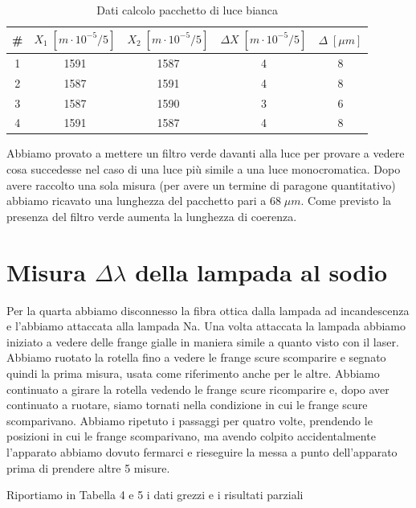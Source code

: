 \documentclass{article}
\begin{document}
\begin{table}[h!]
\centering
\begin{tabular}{ | c | c | c | c | c | }
\hline
\# & $X_1 \; [m \cdot 10^{-5}/5]$ & $X_2 \; [m \cdot 10^{-5}/5]$ & $\Delta X \; [m \cdot 10^{-5}/5]$ & $\Delta \; [\mu m]$\\
\hline
   1 & 1591 & 1587 & 4 & 8\\
   2 & 1587 & 1591 & 4 & 8\\
   3 & 1587 & 1590 & 3 & 6\\
   4 & 1591 & 1587 & 4 & 8\\
\hline
\end{tabular}
\caption{Dati calcolo pacchetto di luce bianca}
\label{table:3}
\end{table}


Abbiamo provato a mettere un filtro verde davanti alla luce per provare a vedere cosa succedesse nel caso di una luce più simile a una luce monocromatica. Dopo avere raccolto una sola misura (per avere un termine di paragone quantitativo) abbiamo ricavato una lunghezza del pacchetto pari a $68 \; \mu m$. Come previsto la presenza del filtro verde aumenta la lunghezza di coerenza.



\section{Misura $\Delta\lambda$ della lampada al sodio}
Per la quarta abbiamo disconnesso la fibra ottica dalla lampada ad incandescenza e l'abbiamo attaccata alla lampada Na. Una volta attaccata la lampada abbiamo iniziato a vedere delle frange gialle in maniera simile a quanto visto con il laser. Abbiamo ruotato la rotella fino a vedere le frange scure scomparire e segnato quindi la prima misura, usata come riferimento anche per le altre. Abbiamo continuato a girare la rotella vedendo le frange scure ricomparire e, dopo aver continuato a ruotare, siamo tornati nella condizione in cui le frange scure scomparivano. Abbiamo ripetuto i passaggi per quatro volte, prendendo le posizioni in cui le frange scomparivano, ma avendo colpito accidentalmente l'apparato abbiamo dovuto fermarci e rieseguire la messa a punto dell'apparato prima di prendere altre 5 misure.

\vspace{3mm}

\clearpage

Riportiamo in Tabella 4 e 5 i dati grezzi e i risultati parziali
\end{document}
